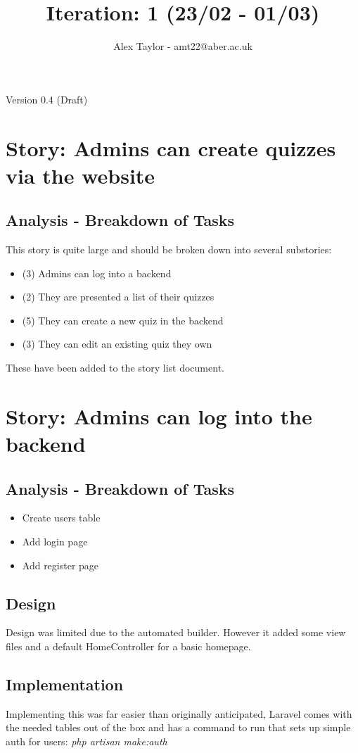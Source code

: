 \documentclass{article}
\title{Iteration: 1 (23/02 - 01/03)}
\author{Alex Taylor - amt22@aber.ac.uk}
\begin{document}
\maketitle
\begin{center}
	Version 0.4 (Draft)
\end{center}
\tableofcontents
\thispagestyle{empty}
\newpage

\section{Story: Admins can create quizzes via the website}
\subsection{Analysis - Breakdown of Tasks}
This story is quite large and should be broken down into several substories:
\begin{itemize}
	\item (3) Admins can log into a backend
	\item (2) They are presented a list of their quizzes
	\item (5) They can create a new quiz in the backend
	\item (3) They can edit an existing quiz they own
\end{itemize}
These have been added to the story list document.
\newpage

\section{Story: Admins can log into the backend}
\subsection{Analysis - Breakdown of Tasks}
\begin{itemize}
	\item Create users table
	\item Add login page
	\item Add register page
\end{itemize}
\subsection{Design}
Design was limited due to the automated builder. However it added some view files and a default HomeController for a basic homepage.
\subsection{Implementation}
Implementing this was far easier than originally anticipated, Laravel comes with the needed tables out of the box and has a command to run that sets up simple auth for users: \textit{php artisan make:auth}
\end{document}
